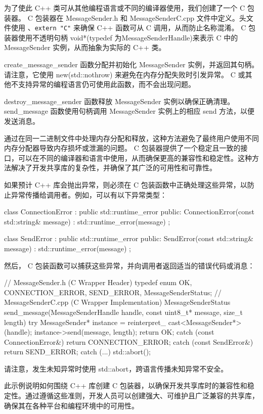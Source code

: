 为了使此 C++ 类可从其他编程语言或不同的编译器使用，我们创建了一个 C 包装器。 C 包装器在 MessageSender.h 和 MessageSenderC.cpp 文件中定义。头文件使用 、\verb|extern "C"| 来确保 C++ 函数可从 C 调用，从而防止名称混淆。 C 包装器使用不透明句柄 void*(typedef 为MessageSenderHandle)来表示 C 中的 MessageSender 实例，从而抽象为实际的 C++ 类。

create\_message\_sender 函数分配并初始化 MessageSender 实例，并返回其句柄。请注意，它使用 new(std::nothrow) 来避免在内存分配失败时引发异常。 C 或其他不支持异常的编程语言仍可使用此函数，而不会出现问题。

destroy\_message\_sender 函数释放 MessageSender 实例以确保正确清理。 send\_message 函数使用句柄调用 MessageSender 实例上的相应 send 方法，以便发送消息。

通过在同一二进制文件中处理内存分配和释放，这种方法避免了最终用户使用不同内存分配器导致内存损坏或泄漏的问题。 C 包装器提供了一个稳定且一致的接口，可以在不同的编译器和语言中使用，从而确保更高的兼容性和稳定性。这种方法解决了开发共享库的复杂性，并确保了其广泛的可用性和可靠性。

如果预计 C++ 库会抛出异常，则必须在 C 包装函数中正确处理这些异常，以防止异常传播给调用者。例如，可以有以下异常类型：

\begin{cpp}
class ConnectionError : public std::runtime_error {
public:
    ConnectionError(const std::string& message) : std::runtime_error(message) {}
};

class SendError : public std::runtime_error {
public:
    SendError(const std::string& message) : std::runtime_error(message) {}
};
\end{cpp}

然后， C 包装函数可以捕获这些异常，并向调用者返回适当的错误代码或消息：

\begin{cpp}
// MessageSender.h (C Wrapper Header)
typedef enum {
    OK,
    CONNECTION_ERROR,
    SEND_ERROR,
} MessageSenderStatus;
// MessageSenderC.cpp (C Wrapper Implementation)
MessageSenderStatus send_message(MessageSenderHandle handle, const
uint8_t* message, size_t length) {
    try {
        MessageSender* instance = reinterpret_
        cast<MessageSender*>(handle);
        instance->send(message, length);
        return OK;
    } catch (const ConnectionError&) {
        return CONNECTION_ERROR;
    } catch (const SendError&) {
        return SEND_ERROR;
    } catch (...) {
        std::abort();
    }
}
\end{cpp}

请注意，发生未知异常时使用 std::abort，跨语言传播未知异常不安全。

此示例说明如何围绕 C++ 库创建 C 包装器，以确保开发共享库时的兼容性和稳定性。通过遵循这些准则，开发人员可以创建强大、可维护且广泛兼容的共享库，确保其在各种平台和编程环境中的可用性。










